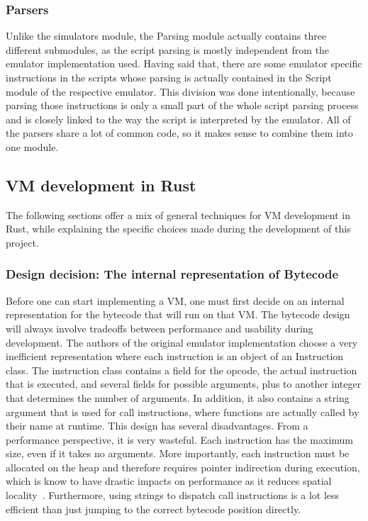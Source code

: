 \subsubsection{Parsers}
Unlike the simulators module, the Parsing module actually contains three different submodules, as the script parsing is mostly independent from the emulator implementation used.
Having said that, there are some emulator specific instructions in the scripts whose parsing is actually contained in the Script module of the respective emulator. This division was done intentionally, because parsing those instructions is only a small part of the whole script parsing process and is closely linked to the way the script is interpreted by the emulator.
All of the parsers share a lot of common code, so it makes sense to combine them into one module.

\subsection{VM development in Rust} \label{rust-vm-dev}
The following sections offer a mix of general techniques for VM development in Rust, while explaining the specific choices made during the development of this project.

\subsubsection{Design decision: The internal representation of Bytecode}
Before one can start implementing a VM, one must first decide on an internal representation for the bytecode that will run on that VM.
The bytecode design will always involve tradeoffs between performance and usability during development.
The authors of the original emulator implementation choose a very inefficient representation where each instruction is an object of an Instruction class. The instruction class contains a field for the opcode, the actual instruction that is executed, and several fields for possible arguments, plus to another integer that determines the number of arguments.
In addition, it also contains a string argument that is used for call instructions, where functions are actually called by their name at runtime.
This design has several disadvantages. From a performance perspective, it is very wasteful. Each instruction has the maximum size, even if it takes no arguments. More importantly, each instruction must be allocated on the heap and therefore requires pointer indirection during execution, which is know to have drastic impacts on performance as it reduces spatial locality~\cite{6498541}.
Furthermore, using strings to dispatch call instructions is a lot less efficient than just jumping to the correct bytecode position directly.

